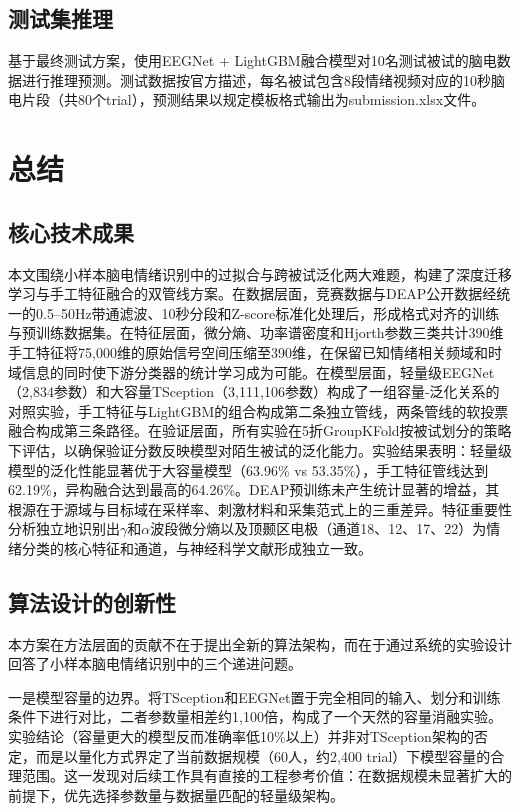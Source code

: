 \documentclass[UTF8,zihao=-4,fontset=windows]{ctexart}
\numberwithin{equation}{section}
\numberwithin{figure}{section}
\numberwithin{table}{section}
\begin{document}
\subsection{测试集推理}

基于最终测试方案，使用EEGNet + LightGBM融合模型对10名测试被试的脑电数据进行推理预测。测试数据按官方描述，每名被试包含8段情绪视频对应的10秒脑电片段（共80个trial），预测结果以规定模板格式输出为submission.xlsx文件。

\section{总结}

\subsection{核心技术成果}

本文围绕小样本脑电情绪识别中的过拟合与跨被试泛化两大难题，构建了深度迁移学习与手工特征融合的双管线方案。在数据层面，竞赛数据与DEAP公开数据经统一的0.5--50Hz带通滤波、10秒分段和Z-score标准化处理后，形成格式对齐的训练与预训练数据集。在特征层面，微分熵、功率谱密度和Hjorth参数三类共计390维手工特征将75,000维的原始信号空间压缩至390维，在保留已知情绪相关频域和时域信息的同时使下游分类器的统计学习成为可能。在模型层面，轻量级EEGNet（2,834参数）和大容量TSception（3,111,106参数）构成了一组容量-泛化关系的对照实验，手工特征与LightGBM的组合构成第二条独立管线，两条管线的软投票融合构成第三条路径。在验证层面，所有实验在5折GroupKFold按被试划分的策略下评估，以确保验证分数反映模型对陌生被试的泛化能力。实验结果表明：轻量级模型的泛化性能显著优于大容量模型（63.96\% vs 53.35\%），手工特征管线达到62.19\%，异构融合达到最高的64.26\%。DEAP预训练未产生统计显著的增益，其根源在于源域与目标域在采样率、刺激材料和采集范式上的三重差异。特征重要性分析独立地识别出$\gamma$和$\alpha$波段微分熵以及顶颞区电极（通道18、12、17、22）为情绪分类的核心特征和通道，与神经科学文献形成独立一致。

\subsection{算法设计的创新性}

本方案在方法层面的贡献不在于提出全新的算法架构，而在于通过系统的实验设计回答了小样本脑电情绪识别中的三个递进问题。

一是模型容量的边界。将TSception和EEGNet置于完全相同的输入、划分和训练条件下进行对比，二者参数量相差约1,100倍，构成了一个天然的容量消融实验。实验结论（容量更大的模型反而准确率低10\%以上）并非对TSception架构的否定，而是以量化方式界定了当前数据规模（60人，约2,400 trial）下模型容量的合理范围。这一发现对后续工作具有直接的工程参考价值：在数据规模未显著扩大的前提下，优先选择参数量与数据量匹配的轻量级架构。
\end{document}
